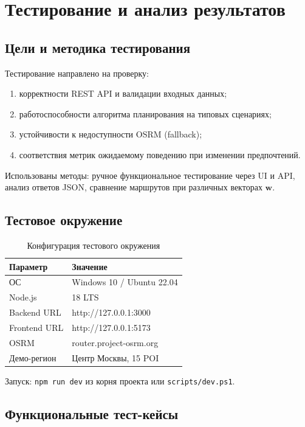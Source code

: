 \chapter{Тестирование и анализ результатов}
\label{ch:testing}

\section{Цели и методика тестирования}

Тестирование направлено на проверку:
\begin{enumerate}
  \item корректности REST API и валидации входных данных;
  \item работоспособности алгоритма планирования на типовых сценариях;
  \item устойчивости к недоступности OSRM (fallback);
  \item соответствия метрик ожидаемому поведению при изменении предпочтений.
\end{enumerate}

Использованы методы: ручное функциональное тестирование через UI и API,
анализ ответов JSON, сравнение маршрутов при различных векторах $\mathbf{w}$.

\section{Тестовое окружение}

\begin{table}[H]
\centering
\caption{Конфигурация тестового окружения}
\label{tab:test-env}
\begin{tabular}{@{}ll@{}}
\toprule
\textbf{Параметр} & \textbf{Значение} \\
\midrule
ОС & Windows 10 / Ubuntu 22.04 \\
Node.js & 18 LTS \\
Backend URL & http://127.0.0.1:3000 \\
Frontend URL & http://127.0.0.1:5173 \\
OSRM & router.project-osrm.org \\
Демо-регион & Центр Москвы, 15 POI \\
\bottomrule
\end{tabular}
\end{table}

Запуск: \texttt{npm run dev} из корня проекта или \texttt{scripts/dev.ps1}.

\section{Функциональные тест-кейсы}

